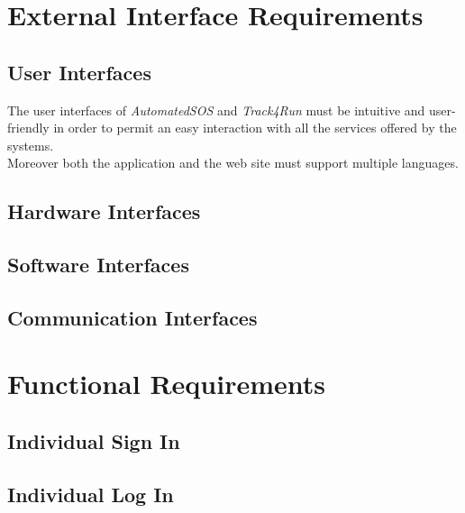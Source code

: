 \section{External Interface Requirements}

\subsection{User Interfaces}
The user interfaces of \textit{AutomatedSOS} and \textit{Track4Run} must be intuitive and user-friendly in order to permit an easy interaction with all the services offered by the systems.\\
Moreover both the application and the web site must support multiple languages.

\subsection{Hardware Interfaces}

\subsection{Software Interfaces}

\subsection{Communication Interfaces}

\clearpage
\section{Functional Requirements}

\subsection{Individual Sign In}

\clearpage

\subsection{Individual Log In}

\clearpage
